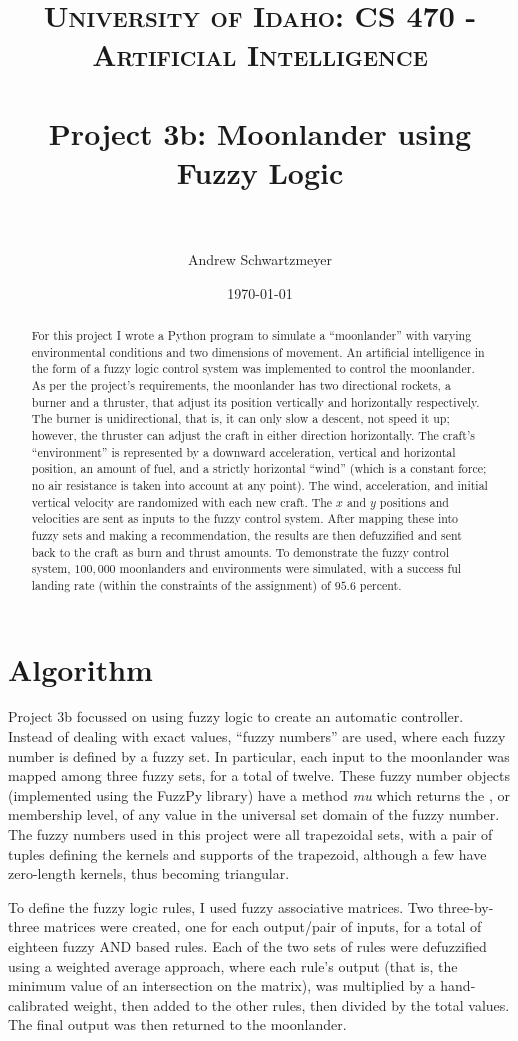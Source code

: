 \documentclass[12pt, article]{scrartcl}
\title{	
\normalfont \normalsize 
\textsc{University of Idaho: CS 470 - Artificial Intelligence} \\ [25pt]
\horrule{0.5pt} \\[0.4cm]
\huge Project 3b: Moonlander using Fuzzy Logic\\
\horrule{2pt} \\[0.5cm]
}
\author{Andrew Schwartzmeyer}
\date{\normalsize\today}
\begin{document}
\maketitle 
\begin{abstract}
For this project I wrote a Python program to simulate a ``moonlander'' with varying environmental conditions and two dimensions of movement. An artificial intelligence in the form of a fuzzy logic control system was implemented to control the moonlander. As per the project's requirements, the moonlander has two directional rockets, a burner and a thruster, that adjust its position vertically and horizontally respectively. The burner is unidirectional, that is, it can only slow a descent, not speed it up; however, the thruster can adjust the craft in either direction horizontally. The craft's ``environment'' is represented by a downward acceleration, vertical and horizontal position, an amount of fuel, and a strictly horizontal ``wind'' (which is a constant force; no air resistance is taken into account at any point). The wind, acceleration, and initial vertical velocity are randomized with each new craft. The $x$ and $y$ positions and velocities are sent as inputs to the fuzzy control system. After mapping these into fuzzy sets and making a recommendation, the results are then defuzzified and sent back to the craft as burn and thrust amounts. To demonstrate the fuzzy control system, $100,000$ moonlanders and environments were simulated, with a success ful landing rate (within the constraints of the assignment) of $95.6$ percent.
\end{abstract}
\pagebreak
\section{Algorithm}
Project 3b focussed on using fuzzy logic to create an automatic controller. Instead of dealing with exact values, ``fuzzy numbers'' are used, where each fuzzy number is defined by a fuzzy set. In particular, each input to the moonlander was mapped among three fuzzy sets, for a total of twelve. These fuzzy number objects (implemented using the FuzzPy library) have a method \emph{mu} which returns the \mu, or membership level, of any value in the universal set domain of the fuzzy number. The fuzzy numbers used in this project were all trapezoidal sets, with a pair of tuples defining the kernels and supports of the trapezoid, although a few have zero-length kernels, thus becoming triangular.

To define the fuzzy logic rules, I used fuzzy associative matrices. Two three-by-three matrices were created, one for each output/pair of inputs, for a total of eighteen fuzzy AND based rules. Each of the two sets of rules were defuzzified using a weighted average approach, where each rule's output (that is, the minimum \mu value of an intersection on the matrix), was multiplied by a hand-calibrated weight, then added to the other rules, then divided by the total \mu values. The final output was then returned to the moonlander.
\end{document}
